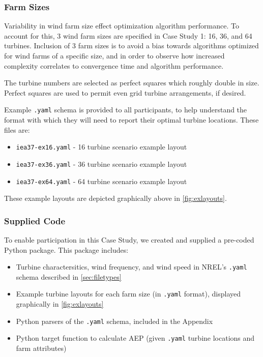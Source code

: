 	\subsubsection{Farm Sizes}
        Variability in wind farm size effect optimization algorithm performance.
        To account for this, 3 wind farm sizes are specified in Case Study 1: 16, 36, and 64 turbines.
        Inclusion of 3 farm sizes is to avoid a bias towards algorithms optimized for wind farms of a specific size, and in order to observe how increased complexity correlates to convergence time and algorithm performance.
        
        The turbine numbers are selected as perfect squares which roughly double in size.
        Perfect squares are used to permit even grid turbine arrangements, if desired.

        Example \texttt{.yaml} schema is provided to all participants, to help understand the format with which they will need to report their optimal turbine locations.
        These files are:

        \begin{itemize}
            \item \texttt{iea37-ex16.yaml} - 16 turbine scenario example layout
            \item \texttt{iea37-ex36.yaml} - 36 turbine scenario example layout
            \item \texttt{iea37-ex64.yaml} - 64 turbine scenario example layout
        \end{itemize}

        \noindent These example layouts are depicted graphically above in \cref{fig:exlayouts}.
        
    \subsubsection{Supplied Code} \label{sec:code}

        To enable participation in this Case Study, we created and supplied a pre-coded Python package.
        This package includes:
            \begin{itemize}
                \item Turbine charactersitics, wind frequency, and wind speed in NREL's \texttt{.yaml} schema described in \cref{sec:filetypes}
                \item Example turbine layouts for each farm size (in \texttt{.yaml} format), displayed graphically in \cref{fig:exlayouts}
                \item Python parsers of the \texttt{.yaml} schema, included in the Appendix
                \item Python target function to calculate AEP (given \texttt{.yaml} turbine locations and farm attributes)
            \end{itemize}

